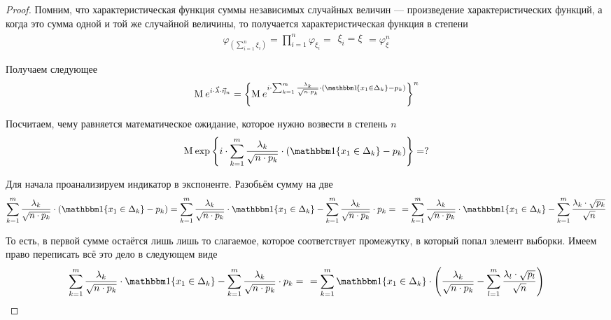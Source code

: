\begin{proof}
  Помним, что характеристическая функция суммы независимых случайных величин
  --- произведение характеристических функций, а когда это сумма одной и той
  же случайной величины, то получается характеристическая функция в степени
  \begin{align*}
      \varphi_{\left( \sum_{i=1}^n \xi_i \right)}
      = \prod_{i=1}^n{\varphi_{\xi_i}}
      = \begin{array}{|c|}
      \xi_i = \xi
      \end{array}
      = \varphi_{\xi}^n
  \end{align*}

  Получаем следующее
  \begin{align*}
      \mean{e^{i \cdot \vec{\lambda} \cdot \vec{\eta}_n}}
      = \left\{ \mean{e^{i \cdot \sum_{k=1}^{m}\frac{\lambda_k}{
          \sqrt{n \cdot p_k}} \cdot \left(
          \Indicator{x_1 \in \Delta_k} - p_k \right)}} \right\}^n
  \end{align*}

  Посчитаем, чему равняется математическое ожидание, которое нужно возвести
  в степень $n$
  \begin{equation}\label{eq:criteriaPirson:meanPowerable}
      \mean{\exp{\left\{ i \cdot \sum_{k=1}^{m}\frac{\lambda_k}{
          \sqrt{n \cdot p_k}} \cdot \left(
          \Indicator{x_1 \in \Delta_k} - p_k \right) \right\}}} = ?
  \end{equation}

  Для начала проанализируем индикатор в экспоненте.
  Разобьём сумму на две
  \begin{align*}
      \sum_{k=1}^{m}\frac{\lambda_k}{\sqrt{n \cdot p_k}} \cdot \left(
          \Indicator{x_1 \in \Delta_k} - p_k \right)
      = \sum_{k=1}^{m}\frac{\lambda_k}{\sqrt{n \cdot p_k}}
          \cdot \Indicator{x_1 \in \Delta_k}
      - \sum_{k=1}^{m}\frac{\lambda_k}{\sqrt{n \cdot p_k}} \cdot p_k = \ \
      = \sum_{k=1}^{m}\frac{\lambda_k}{\sqrt{n \cdot p_k}}
          \cdot \Indicator{x_1 \in \Delta_k}
      - \sum_{k=1}^{m}\frac{\lambda_k \cdot \sqrt{p_k}}{\sqrt{n}}
  \end{align*}

  То есть, в первой сумме остаётся лишь лишь то слагаемое, которое
  соответствует промежутку, в который попал элемент выборки. Имеем право
  переписать всё это дело в следующем виде
  \begin{align*}
      \sum_{k=1}^{m}\frac{\lambda_k}{\sqrt{n \cdot p_k}}
          \cdot \Indicator{x_1 \in \Delta_k}
      - \sum_{k=1}^{m}\frac{\lambda_k}{\sqrt{n \cdot p_k}} \cdot p_k = \ \
      = \sum_{k=1}^{m} \Indicator{x_1 \in \Delta_k} \cdot \left(
      \frac{\lambda_k}{\sqrt{n \cdot p_k}} - \sum_{l=1}^{m}
          \frac{\lambda_l \cdot \sqrt{p_l}}{\sqrt{n}} \right)
  \end{align*}


\end{proof}
